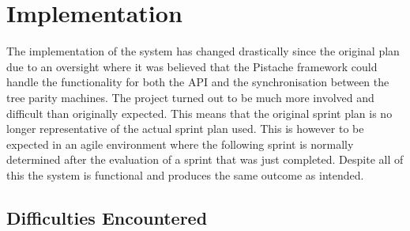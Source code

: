 \chapter{Implementation}
\label{chap:imp}
The implementation of the system has changed drastically since the original plan due to an oversight where it was believed that the Pistache framework could handle the functionality for both the API and the synchronisation between the tree parity machines. The project turned out to be much more involved and difficult than originally expected. This means that the original sprint plan is no longer representative of the actual sprint plan used. This is however to be expected in an agile environment where the following sprint is normally determined after the evaluation of a sprint that was just completed. Despite all of this the system is functional and produces the same outcome as intended.

\section{Difficulties Encountered}

